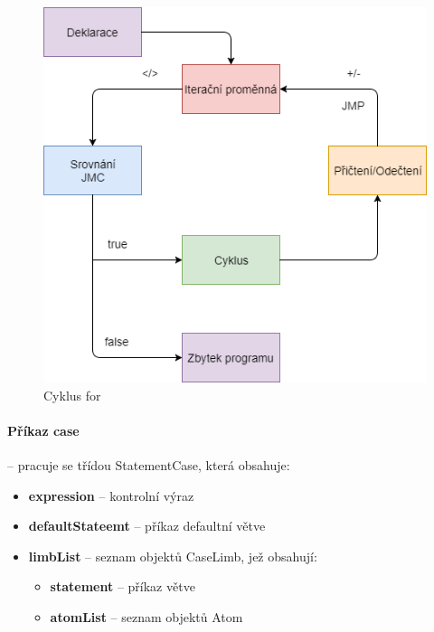 \documentclass[
12pt,
a4paper,
pdftex,
czech,
titlepage
]{report}
\begin{document}
\begin{figure}[H]
\caption{Cyklus for}
\label{for}
\includegraphics[width=\textwidth]{for.png}
\end{figure}

\paragraph{Příkaz case} -- pracuje se třídou StatementCase, která obsahuje:
\begin{itemize}
\item \textbf{expression} -- kontrolní výraz
\item \textbf{defaultStateemt} -- příkaz defaultní větve
\item \textbf{limbList} -- seznam objektů CaseLimb, jež obsahují:
\begin{itemize}
\item \textbf{statement} -- příkaz větve
\item \textbf{atomList} -- seznam objektů Atom
\end{itemize}
\end{itemize}
\end{document}
